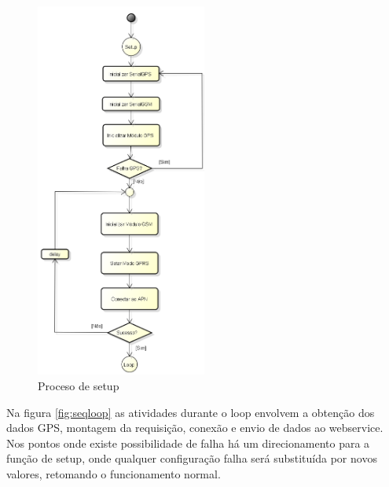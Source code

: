 \begin{figure}[!h]
	\centering
	\includegraphics[width=0.5\textwidth]{figures/ModuloVeicular_Boot.png}
	\caption{Proceso de setup}
	\label{fig:seqsetup}
\end{figure}

\newpage
Na figura \ref{fig:seqloop} as atividades durante o loop envolvem a obtenção dos dados GPS, montagem da requisição, conexão e envio de dados ao webservice. Nos pontos onde existe possibilidade de falha há um direcionamento para a função de setup, onde qualquer configuração falha será substituída por novos valores, retomando o funcionamento normal.

